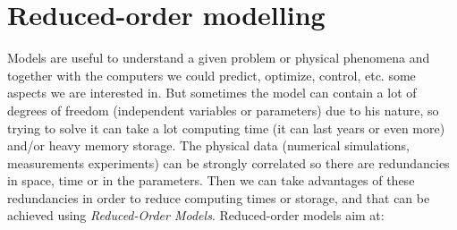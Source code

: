 \documentclass[twoside,11pt]{Latex/Classes/PhDthesisPSnPDF_jacob}
\begin{document}
			
	\mainmatter				

    		\graphicspath{{figures/PNG/}{figures/PDF/}{figures/}}		
%																
\else%
	\graphicspath{{1_introduction/figures/PNG/}{1_introduction/figures/PDF/}{1_introduction/figures/}}							
\fi%
%															
%															




\chapter{Reduced-order modelling}

Models are useful to understand a given problem or physical phenomena and together with the computers we could predict, optimize, control, etc. some aspects we are interested in. But sometimes the model can contain a lot of degrees of freedom (independent variables or parameters) due to his nature, so trying to solve it can take a lot computing time (it can last years or even more) and/or heavy memory storage. The physical data (numerical simulations, measurements experiments) can be strongly correlated so there are redundancies in space, time or in the parameters. Then we can take advantages of these redundancies in order to reduce computing times or storage, and that can be achieved using \textit{Reduced-Order Models}. Reduced-order models aim at:
\end{document}
